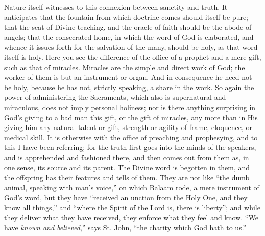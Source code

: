 Nature itself witnesses to this connexion between sanctity and
truth. It anticipates that the fountain from which doctrine comes
should itself be pure; that the seat of Divine teaching, and the
oracle of faith should be the abode of angels; that the consecrated
home, in which the word of God is elaborated, and whence it issues
forth for the salvation of the many, should be holy, as that word
itself is holy. Here you see the difference of the office of a prophet
and a mere gift, such as that of miracles. Miracles are the simple and
direct work of God; the worker of them is but an instrument or organ.
And in consequence he need not be holy, because he has not, strictly
speaking, a share in the work. So again the power of administering the
Sacraments, which also is supernatural and miraculous, does not imply
personal holiness; nor is there anything surprising in God's giving to
a bad man this gift, or the gift of miracles, any more than in His
giving him any natural talent or gift, strength or agility of frame,
eloquence, or medical skill. It is otherwise with the office of
preaching and prophesying, and to this I have been referring; for the
truth first goes into the minds of the speakers, and is apprehended
and fashioned there, and then comes out from them as, in one sense,
its source and its parent. The Divine word is begotten in them, and
the offspring has their features and tells of them. They are not like
``the dumb animal, speaking with man's voice,'' on which
Balaam rode, a mere instrument of God's word, but they have
``received an unction from the Holy One, and they know all
things,'' and ``where the Spirit of the Lord is, there is
liberty''; and while they deliver what they have received, they
enforce what they feel and know. ``We have \emph{known and believed},''
says St. John, ``the charity which God hath to us.''

